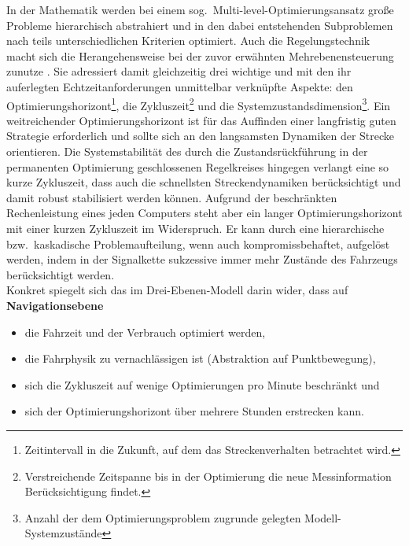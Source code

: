 
In der Mathematik werden bei einem sog.\ Multi-level-Optimierungsansatz große Probleme hierarchisch abstrahiert und in den dabei entstehenden Subproblemen nach teils unterschiedlichen Kriterien optimiert. Auch die Regelungstechnik macht sich die Herangehensweise bei der zuvor erwähnten Mehrebenensteuerung zunutze \cite{lunze2005regelungstechnik}. Sie adressiert damit gleichzeitig drei wichtige und mit den ihr auferlegten Echtzeitanforderungen unmittelbar verknüpfte Aspekte: den Optimierungshorizont\footnote{Zeitintervall in die Zukunft, auf dem das Streckenverhalten betrachtet wird.}, die Zykluszeit\footnote{Verstreichende Zeitspanne bis in der Optimierung die neue Messinformation Berücksichtigung findet.} und die Systemzustandsdimension\footnote{Anzahl der dem Optimierungsproblem zugrunde gelegten Modell-Systemzustände}. Ein weitreichender Optimierungshorizont ist für das Auffinden einer langfristig guten Strategie erforderlich und sollte sich an den langsamsten Dynamiken der Strecke orientieren. Die Systemstabilität des durch die Zustandsrückführung in der permanenten Optimierung geschlossenen Regelkreises hingegen verlangt eine so kurze Zykluszeit, dass auch die schnellsten Streckendynamiken berücksichtigt und damit robust stabilisiert werden können. Aufgrund der beschränkten Rechenleistung eines jeden Computers steht aber ein langer Optimierungshorizont mit einer kurzen Zykluszeit im Widerspruch. %
Er kann durch eine hierarchische bzw.\ kaskadische Problemaufteilung, wenn auch kompromissbehaftet, aufgelöst werden, indem in der Signalkette sukzessive immer mehr Zustände des Fahrzeugs berücksichtigt werden. \\
Konkret spiegelt sich das im Drei-Ebenen-Modell darin wider, dass auf \textbf{Navigationsebene}
\begin{itemize}
\item die Fahrzeit und der Verbrauch optimiert werden, 
\item die Fahrphysik zu vernachlässigen ist (Abstraktion auf Punktbewegung), 
\item sich die Zykluszeit auf wenige Optimierungen pro Minute beschränkt und 
\item sich der Optimierungshorizont über mehrere Stunden erstrecken kann. 
\end{itemize}
